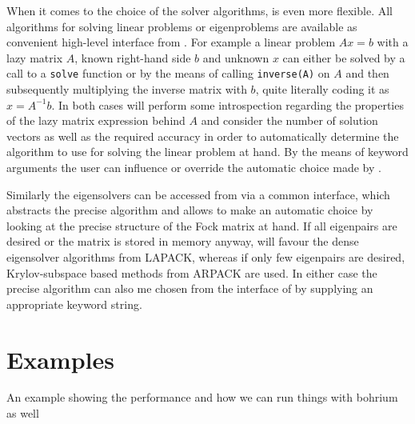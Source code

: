 When it comes to the choice of the solver algorithms, \lazyten is even more flexible.
All algorithms for solving linear problems or eigenproblems are available as 
convenient high-level interface from \gscf.
For example a linear problem $A x = b$ with a lazy matrix $A$, known right-hand side $b$
and unknown $x$ can either be solved by a call to a \texttt{solve} function or by
the means of calling \texttt{inverse(A)} on $A$ and then subsequently
multiplying the inverse matrix with $b$, quite literally coding it as $x = A^{-1} b$.
In both cases \lazyten will perform some introspection regarding the properties of
the lazy matrix expression behind $A$ and consider the number of solution
vectors as well as the required accuracy in order to automatically determine the algorithm to use
for solving the linear problem at hand.
By the means of keyword arguments the user can influence or override the automatic
choice made by \lazyten.

Similarly the eigensolvers can be accessed from \gscf via a common interface,
which abstracts the precise algorithm and allows \lazyten to make an automatic
choice by looking at the precise structure of the Fock matrix at hand.
If all eigenpairs are desired or the matrix is stored in memory anyway,
\lazyten will favour the dense eigensolver algorithms from LAPACK,
whereas if only few eigenpairs are desired,
Krylov-subspace based methods from ARPACK are used.
In either case the precise algorithm can also me chosen from the \python interface
of \molsturm by supplying an appropriate keyword string.


\section{Examples}
An example showing the performance and how we can run things with bohrium as well

